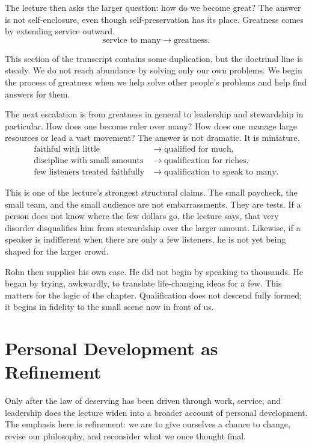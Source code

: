 The lecture then asks the larger question: how do we become great? The answer is not self-enclosure, even though self-preservation has its place. Greatness comes by extending service outward.
\begin{equation}
\text{service to many} \rightarrow \text{greatness}.
\end{equation}

This section of the transcript contains some duplication, but the doctrinal line is steady. We do not reach abundance by solving only our own problems. We begin the process of greatness when we help solve other people's problems and help find answers for them.

The next escalation is from greatness in general to leadership and stewardship in particular. How does one become ruler over many? How does one manage large resources or lead a vast movement? The answer is not dramatic. It is miniature.
\begin{align}
\text{faithful with little} &\rightarrow \text{qualified for much}, \\
\text{discipline with small amounts} &\rightarrow \text{qualification for riches}, \\
\text{few listeners treated faithfully} &\rightarrow \text{qualification to speak to many}.
\end{align}

This is one of the lecture's strongest structural claims. The small paycheck, the small team, and the small audience are not embarrassments. They are tests. If a person does not know where the few dollars go, the lecture says, that very disorder disqualifies him from stewardship over the larger amount. Likewise, if a speaker is indifferent when there are only a few listeners, he is not yet being shaped for the larger crowd.

Rohn then supplies his own case. He did not begin by speaking to thousands. He began by trying, awkwardly, to translate life-changing ideas for a few. This matters for the logic of the chapter. Qualification does not descend fully formed; it begins in fidelity to the small scene now in front of us.

\section{Personal Development as Refinement}

Only after the law of deserving has been driven through work, service, and leadership does the lecture widen into a broader account of personal development. The emphasis here is refinement: we are to give ourselves a chance to change, revise our philosophy, and reconsider what we once thought final.

